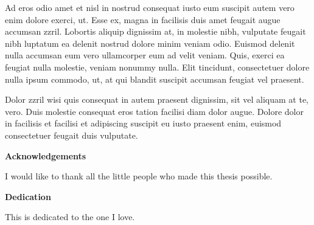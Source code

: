 \documentclass[letterpaper,12pt,titlepage,oneside,final]{book}
\let\origdoublepage\cleardoublepage
\newcommand{\clearemptydoublepage}{%
  \clearpage{\pagestyle{empty}\origdoublepage}}
\let\cleardoublepage\clearemptydoublepage
\begin{document}
Ad eros odio amet et nisl in nostrud consequat iusto eum suscipit autem vero enim dolore exerci, ut. Esse ex, magna in facilisis duis amet feugait augue accumsan zzril. Lobortis aliquip dignissim at, in molestie nibh, vulputate feugait nibh luptatum ea delenit nostrud dolore minim veniam odio. Euismod delenit nulla accumsan eum vero ullamcorper eum ad velit veniam. Quis, exerci ea feugiat nulla molestie, veniam nonummy nulla. Elit tincidunt, consectetuer dolore nulla ipsum commodo, ut, at qui blandit suscipit accumsan feugiat vel praesent.

Dolor zzril wisi quis consequat in autem praesent dignissim, sit vel aliquam at te, vero. Duis molestie consequat eros tation facilisi diam dolor augue. Dolore dolor in facilisis et facilisi et adipiscing suscipit eu iusto praesent enim, euismod consectetuer feugait duis vulputate.

\cleardoublepage
{}    %

\begin{center}\textbf{Acknowledgements}\end{center}

I would like to thank all the little people who made this thesis possible.
\cleardoublepage
{}    %

\begin{center}\textbf{Dedication}\end{center}

This is dedicated to the one I love.
\cleardoublepage
{}    %

\renewcommand\contentsname{Table of Contents}
\tableofcontents
\cleardoublepage
{}    %

\listoffigures
\cleardoublepage
{}		%

\listoftables
\cleardoublepage
{}		%
\end{document}
